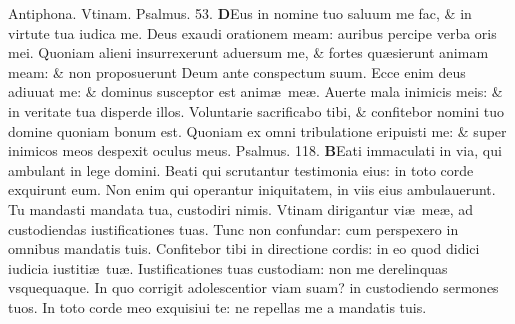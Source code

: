 \documentclass[a5paper,10pt]{book}
\def\ae{æ}
\begin{document}
\begin{multicols*}{2}
\newline \color{red} Antiphona. \color{black} Vtinam. \color{red} Psalmus. \hypertarget{ps53}{53.} \color{black}
\vspace{-.25em}
\lettrine[lines=2]{\bfseries D}{}Eus in nomine tuo saluum me fac, \& in virtute tua iudica me.
\newline \color{red} D\color{black}eus exaudi orationem meam: auribus percipe verba oris mei.
\newline \color{red} Q\color{black}uoniam alieni insurrexerunt aduersum me, \& fortes qu\ae sierunt animam meam: \& non proposuerunt Deum ante conspectum suum.
\newline \color{red} E\color{black}cce enim deus adiuuat me: \& dominus susceptor est anim\ae \ me\ae .
\newline \color{red} A\color{black}uerte mala inimicis meis: \& in veritate tua disperde illos.
\newline \color{red} V\color{black}oluntarie sacrificabo tibi, \& confitebor nomini tuo domine quoniam bonum est.
\newline \color{red} Q\color{black}uoniam ex omni tribulatione eripuisti me: \& super inimicos meos despexit oculus meus. \quad \color{red} Psalmus. \hypertarget{ps118.1}{118.} \color{black}
\vspace{-.25em}
\lettrine[lines=2]{\bfseries \color{red} B}{}Eati immaculati in via, qui ambulant in lege domini.
\newline \color{red} B\color{black}eati qui scrutantur testimonia eius: in toto corde exquirunt eum.
\newline \color{red} N\color{black}on enim qui operantur iniquitatem, in viis eius ambulauerunt.
\newline \color{red} T\color{black}u mandasti mandata tua, custodiri nimis.
\newline \color{red} V\color{black}tinam dirigantur vi\ae \ me\ae , ad custodiendas iustificationes tuas.
\newline \color{red} T\color{black}unc non confundar: cum perspexero in omnibus mandatis tuis.
\newline \color{red} C\color{black}onfitebor tibi in directione cordis: in eo quod didici iudicia iustiti\ae \ tu\ae .
\newline \color{red} I\color{black}ustificationes tuas custodiam: non me derelinquas vsquequaque.
\newline \color{red} I\color{black}n quo corrigit adolescentior viam suam? in custodiendo sermones tuos.
\newline \color{red} I\color{black}n toto corde meo exquisiui te: ne repellas me a mandatis tuis.

\end{multicols*}
\end{document}
